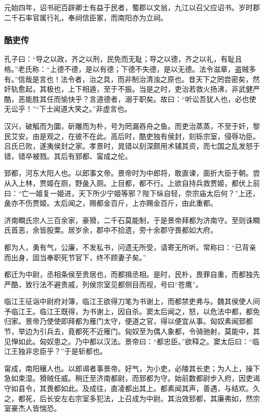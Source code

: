 \documentclass[]{article}
\begin{document}
元始四年，诏书祀百辟卿士有益于民者，蜀郡以文翁，九江以召父应诏书。岁时郡二千石率官属行礼，奉祠信臣冢，而南阳亦为立祠。

\hypertarget{header-n6016}{%
\subsubsection{酷吏传}\label{header-n6016}}

孔子曰：``导之以政，齐之以刑，民免而无耻；导之以德，齐之以礼，有耻且格。''老氏称：``上德不德，是以有德；下德不失德，是以无德。法令滋章，盗贼多有。''信哉是言也！法令者，治之具，而非制治清浊之原也。昔天下之罔尝密矣，然奸轨愈起，其极也，上下相遁，至于不振。当是之时，吏治若救火扬沸，非武健严酷，恶能胜其任而愉快乎？言道德者，溺于职矣。故曰：``听讼吾犹人也，必也使无讼乎！''``下士闻道大笑之。''非虚言也。

汉兴，破觚而为圜，斫雕而为朴，号为罔漏吞舟之鱼。而吏治蒸蒸，不至于奸，黎民艾安。由是观之，在彼不在此。高后时，酷吏独有侯封，刻轹宗室，侵辱功臣。吕氏已败，遂夷侯封之家。孝景时，晁错以刻深颇用术辅其资，而七国之乱发怒于错，错卒被戮。其后有郅都、甯成之伦。

郅都，河东大阳人也。以郎事文帝。景帝时为中郎将，敢直谏，面折大臣于朝。尝从入上林，贾姬在厕，野彘入厕。上目都，都不行。上欲自持兵救贾姬，都伏上前曰：``亡一姬复一姬进，天下所少宁姬等邪？陛下纵自轻，奈宗庙太后何？''上还，彘亦不伤贾姬。太后闻之，赐都金百斤，上亦赐金百斤，由此重都。

济南瞷氏宗人三百余家，豪猾，二千石莫能制，于是景帝拜都为济南守。至则诛瞷氏首恶，余皆股栗。居岁余，郡中不拾遗，旁十余郡守畏都如大府。

都为人，勇有气，公廉，不发私书，问遗无所受，请寄无所听。常称曰：``已背亲而出身，固当奉职死节官下，终不顾妻子矣。''

都迁为中尉，丞相条侯至贵居也，而都揖丞相。是时，民朴，畏罪自重，而都独先严酷，致行法不避贵戚，列侯宗室见都侧目而视，号曰``苍鹰''。

临江王征诣中尉府对簿，临江王欲得刀笔为书谢上，而都禁吏弗与。魏其侯使人间予临江王。临江王既得，为书谢上，因自杀。窦太后闻之，怒，以危法中都，都免归家。景帝乃使使即拜都为雁门太守，便道之官，得以便宜从事。匈奴素闻郅都节，举边为引兵去，竟都死不近雁门。匈奴至为偶人象都，令骑驰射，莫能中，其见惮如此。匈奴患之。乃中都以汉法。景帝曰：``都忠臣。''欲释之。窦太后曰：``临江王独非忠臣乎？''于是斩都也。

甯成，南阳穰人也。以郎谒者事景帝。好气，为小吏，必陵其长吏；为人上，操下急如束湿。猾贼任威。稍迁至济南都尉，而郅都为守。始前数都尉步入府，因吏谒守如县令，其畏都如此。及成往，直凌都出其上。都素闻其声，善遇，与结欢。久之，都死，后长安左右宗室多犯法，上召成为中尉。其治效郅都，其廉弗如，然宗室豪杰人皆惴恐。
\end{document}
